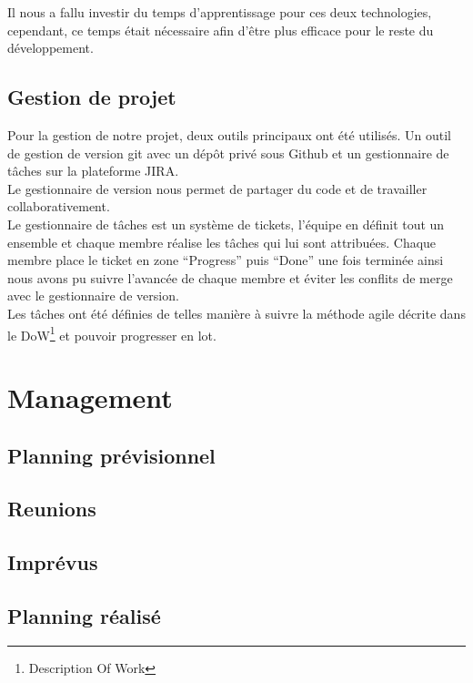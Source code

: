 \documentclass{sigplanconf}
\begin{document}
Il nous a fallu investir du temps d'apprentissage pour ces deux technologies, cependant, ce temps était nécessaire afin d'être plus efficace pour le reste du développement.

\subsection{Gestion de projet}
Pour la gestion de notre projet, deux outils principaux ont été utilisés. Un outil de gestion de version git avec un dépôt privé sous Github et un gestionnaire de tâches sur la plateforme JIRA.\\
Le gestionnaire de version nous permet de partager du code et de travailler collaborativement.\\
Le gestionnaire de tâches est un système de tickets, l’équipe en définit tout un ensemble et chaque membre réalise les tâches qui lui sont attribuées. Chaque membre place le ticket en zone “Progress” puis “Done” une fois terminée ainsi nous avons pu suivre l’avancée de chaque membre et éviter les conflits de merge avec le gestionnaire de version.\\
Les tâches ont été définies de telles manière à suivre la méthode agile décrite dans le DoW\footnote{Description Of Work} et pouvoir progresser en lot.

\section{Management}%
\subsection{Planning prévisionnel}
\subsection{Reunions}
\subsection{Imprévus}
\subsection{Planning réalisé}
\end{document}
